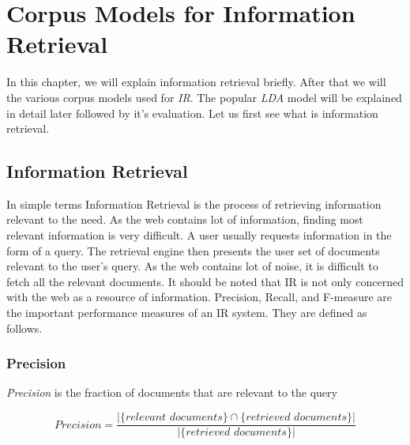 
\chapter{Corpus Models for Information Retrieval} %

\label{ir} %



In this chapter, we will explain information retrieval briefly. After that we will the various corpus models used for
\textit{IR}. The popular \textit{LDA} model will be explained in detail later followed by it's evaluation. Let us first
see what is information retrieval.

\section{Information Retrieval}

\par 
In simple terms Information Retrieval is the process of retrieving information relevant to the need. As the web contains lot of
information, finding most relevant information is very difficult. A user usually requests information in the form of a query.
The retrieval engine then presents the user set of documents relevant to the user's query. As the web contains lot of noise, it
is difficult to fetch all the relevant documents. It should be noted that IR is not only concerned with the web as a resource of
information. Precision, Recall, and F-measure are the important performance measures of an IR system. They are defined as follows.

\subsection*{Precision}

\textit{Precision} is the fraction of documents that are relevant to the query

\begin{equation}
 Precision = \frac{|\{\textit{relevant documents}\} \cap \{\textit{retrieved documents}\}|}{|\{\textit{retrieved documents}\}|}
\end{equation}

